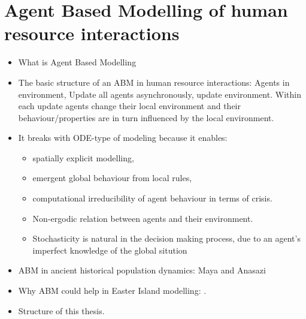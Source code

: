 \section{Agent Based Modelling of human resource interactions}
\begin{itemize}
\item What is Agent Based Modelling
\item The basic structure of an ABM in human resource interactions: Agents in environment, Update all agents asynchronously, update environment. Within each update agents change their local environment and their behaviour/properties are in turn influenced by the local environment. 
\item It breaks with ODE-type of modeling because it enables: 
\begin{itemize}
	\item spatially explicit modelling,
	\item  emergent global behaviour from local rules, 
	\item computational irreducibility of agent behaviour in terms of crisis. 
	\item Non-ergodic relation between agents and their environment.
	\item Stochasticity is natural in the decision making process, due to an agent's imperfect knowledge of the global sitution
\end{itemize}
\item ABM in ancient historical population dynamics: Maya \citep{Heckbert2013} and Anasazi \citep{Axtell2002}
\item Why ABM could help in Easter Island modelling: \citet{Merico2017}.
\item Structure of this thesis.
\end{itemize}

